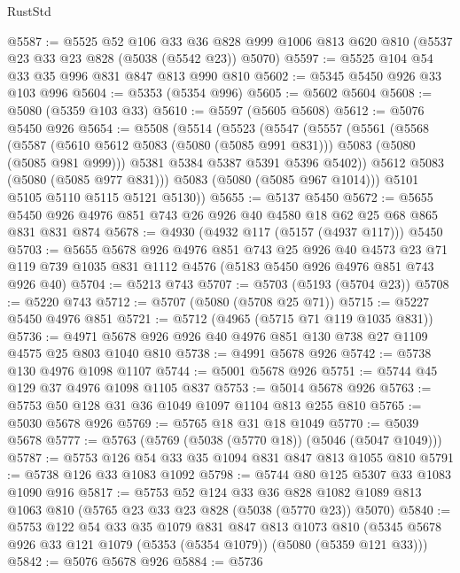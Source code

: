 \begin{lexlean}{RustStd}
\begin{coremodule}
@5587 := @5525
    @52
    @106
    @33
    @36
    @828
    @999
    @1006
    @813
    @620
    @810
    (@5537 @23 @33 @23 @828 (@5038 (@5542 @23)) @5070)
@5597 := @5525 @104 @54 @33 @35 @996 @831 @847 @813 @990 @810
@5602 := @5345 @5450 @926 @33 @103 @996
@5604 := @5353 (@5354 @996)
@5605 := @5602 @5604
@5608 := @5080 (@5359 @103 @33)
@5610 := @5597 (@5605 @5608)
@5612 := @5076 @5450 @926
@5654 := @5508
    (@5514
      (@5523
        (@5547
          (@5557
            (@5561
              (@5568
                (@5587
                  (@5610 @5612 @5083 (@5080 (@5085 @991 @831)))
                  @5083
                  (@5080 (@5085 @981 @999)))
                @5381
                @5384
                @5387
                @5391
                @5396
                @5402))
            @5612
            @5083
            (@5080 (@5085 @977 @831)))
          @5083
          (@5080 (@5085 @967 @1014)))
        @5101
        @5105
        @5110
        @5115
        @5121
        @5130))
@5655 := @5137 @5450
@5672 := @5655 @5450 @926 @4976 @851 @743 @26 @926 @40 @4580 @18 @62 @25 @68 @865 @831 @831 @874
@5678 := @4930 (@4932 @117 (@5157 (@4937 @117))) @5450
@5703 := @5655
    @5678
    @926
    @4976
    @851
    @743
    @25
    @926
    @40
    @4573
    @23
    @71
    @119
    @739
    @1035
    @831
    @1112
    @4576
    (@5183 @5450 @926 @4976 @851 @743 @926 @40)
@5704 := @5213 @743
@5707 := @5703 (@5193 (@5704 @23))
@5708 := @5220 @743
@5712 := @5707 (@5080 (@5708 @25 @71))
@5715 := @5227 @5450 @4976 @851
@5721 := @5712 (@4965 (@5715 @71 @119 @1035 @831))
@5736 := @4971 @5678 @926 @926 @40 @4976 @851 @130 @738 @27 @1109 @4575 @25 @803 @1040 @810
@5738 := @4991 @5678 @926
@5742 := @5738 @130 @4976 @1098 @1107
@5744 := @5001 @5678 @926
@5751 := @5744 @45 @129 @37 @4976 @1098 @1105 @837
@5753 := @5014 @5678 @926
@5763 := @5753 @50 @128 @31 @36 @1049 @1097 @1104 @813 @255 @810
@5765 := @5030 @5678 @926
@5769 := @5765 @18 @31 @18 @1049
@5770 := @5039 @5678
@5777 := @5763 (@5769 (@5038 (@5770 @18)) (@5046 (@5047 @1049)))
@5787 := @5753 @126 @54 @33 @35 @1094 @831 @847 @813 @1055 @810
@5791 := @5738 @126 @33 @1083 @1092
@5798 := @5744 @80 @125 @5307 @33 @1083 @1090 @916
@5817 := @5753
    @52
    @124
    @33
    @36
    @828
    @1082
    @1089
    @813
    @1063
    @810
    (@5765 @23 @33 @23 @828 (@5038 (@5770 @23)) @5070)
@5840 := @5753
    @122
    @54
    @33
    @35
    @1079
    @831
    @847
    @813
    @1073
    @810
    (@5345 @5678 @926 @33 @121 @1079 (@5353 (@5354 @1079)) (@5080 (@5359 @121 @33)))
@5842 := @5076 @5678 @926
@5884 := @5736

\end{coremodule}
\end{lexlean}
